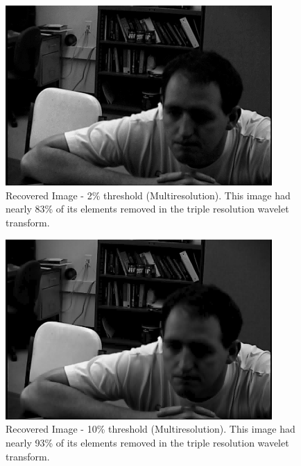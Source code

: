 \begin{figure}[htb]
\begin{center}
\includegraphics [width=4in]{recover3R002T.jpg}
\end{center}
\caption{Recovered Image - 2\% threshold (Multiresolution). This image had nearly 83\% of its elements removed in the triple resolution wavelet transform.  }
\label{recover3R002}
\end{figure}


\begin{figure}[htb]
\begin{center}
\includegraphics [width=4in]{recover3R010T.jpg}
\end{center}
\caption{Recovered Image - 10\% threshold (Multiresolution). This image had nearly 93\% of its elements removed in the triple resolution wavelet transform.  }
\label{recover3R010}
\end{figure}



